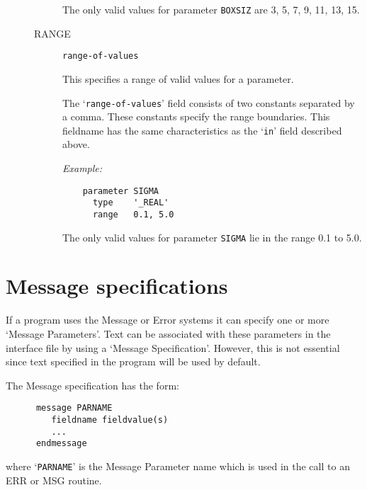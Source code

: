\begin{description}
\begin{description}
The only valid values for parameter \verb+BOXSIZ+ are 3, 5, 7, 9, 11, 13, 15.

\item [RANGE] {\tt range-of-values}

This specifies a range of valid values for a parameter.

The `\verb+range-of-values+' field consists of two constants separated by a
comma.
These constants specify the range boundaries.
This fieldname has the same characteristics as the `\verb+in+' field described
above.

{\em Example:}

\begin{small}
\begin{verbatim}
    parameter SIGMA
      type    '_REAL'
      range   0.1, 5.0
\end{verbatim}
\end{small}

The only valid values for parameter \verb+SIGMA+ lie in the range 0.1 to 5.0.

\end{description}
\end{description}

\section{Message specifications}

If a program uses the Message or Error systems it can specify one or more
`Message Parameters'.
Text can be associated with these parameters in the interface file by using a
`Message Specification'.
However, this is not essential since text specified in the program will be
used by default.

The Message specification has the form:

\begin{small}
\begin{verbatim}
      message PARNAME
         fieldname fieldvalue(s)
         ...
      endmessage
\end{verbatim}
\end{small}

where `\verb+PARNAME+' is the Message Parameter name which is used in the call
to an ERR or MSG routine.

